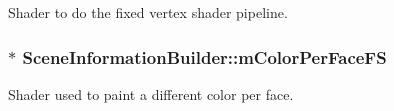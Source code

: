 Shader to do the fixed vertex shader pipeline. 

\hypertarget{class_scene_information_builder_a205c12755edde1932e68bae0e22535f1}{
\subsubsection[{m\+Color\+Per\+Face\+F\+S}]{$\ast$ Scene\+Information\+Builder\+::m\+Color\+Per\+Face\+F\+S\hspace{0.3cm}{\ttfamily [protected]}}}\label{class_scene_information_builder_a205c12755edde1932e68bae0e22535f1}


Shader used to paint a different color per face. 

